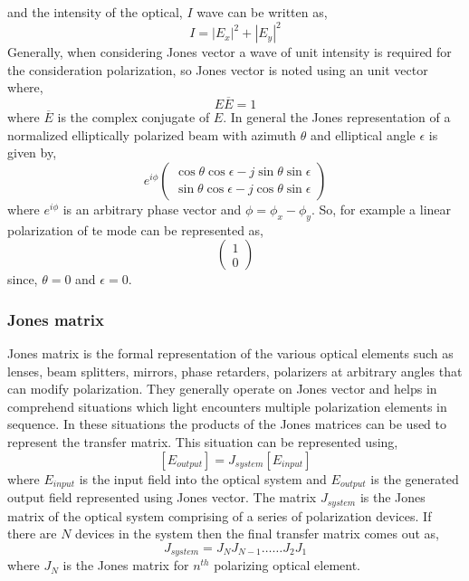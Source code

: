\documentclass[../report.tex]{subfiles}
\begin{document}
and the intensity of the optical, $I$ wave can be written as,
\begin{equation}\label{eq:jones_vector_intensity}
I = \left| E_x\right| ^{2}+\left| E_y\right| ^{2} 
\end{equation}
Generally, when considering Jones vector a wave of unit intensity is required for the consideration polarization, so Jones vector is noted using an unit vector where,
\begin{equation}\label{eq:jones_unit_vector_form}
	E\overline {E} = 1
\end{equation}
where $\overline {E}$ is the complex conjugate of $E$. 
In general the Jones representation of a normalized elliptically polarized beam with azimuth $\theta$ and elliptical angle $\epsilon$ is given by,
\begin{equation}\label{eq:jones_vector_general_form}
e^{i\phi}\left(\begin{matrix} 
\cos\theta\cos\epsilon - j\sin\theta\sin\epsilon\\
\sin\theta\cos\epsilon - j\cos\theta\sin\epsilon 
\end{matrix} \right) 
\end{equation}
where $e^{i\phi}$ is an arbitrary phase vector and $\phi = \phi_x - \phi_y$. So, for example a linear polarization of \gls{te} mode can be represented as,
\begin{equation}\label{eq:jones_vector_linear_pol}
\left(\begin{matrix}  
1 \\
0
\end{matrix} \right) 
\end{equation}
since, $\theta=0$ and $\epsilon = 0$.
			
			\subsubsection{Jones matrix}
Jones matrix is the formal representation of the various optical elements such as lenses, beam splitters, mirrors, phase retarders, polarizers at arbitrary angles that can modify polarization. They generally operate on Jones vector and helps in comprehend situations which light encounters multiple polarization elements in sequence. In these situations the products of the Jones matrices can be used to represent the transfer matrix. This situation can be represented using,
\begin{equation}\label{eq:jones_matrix}
[E_{output}] = J_{system}[E_{input}] 
\end{equation}
where $E_{input}$ is the input field into the optical system and $E_{output}$ is the generated output field represented using Jones vector. The matrix $J_{system}$ is the Jones matrix of the optical system comprising of a series of polarization devices. If there are $N$ devices in the system then the final transfer matrix comes out as,
\begin{equation}\label{eq:jones_transfer_matrix}
J_{system} =J_{N}J_{N-1}\ldots \ldots J_{2}J_{1} 
\end{equation}   
where $J_{N}$ is the Jones matrix for $n^{th}$ polarizing optical element.
\end{document}
